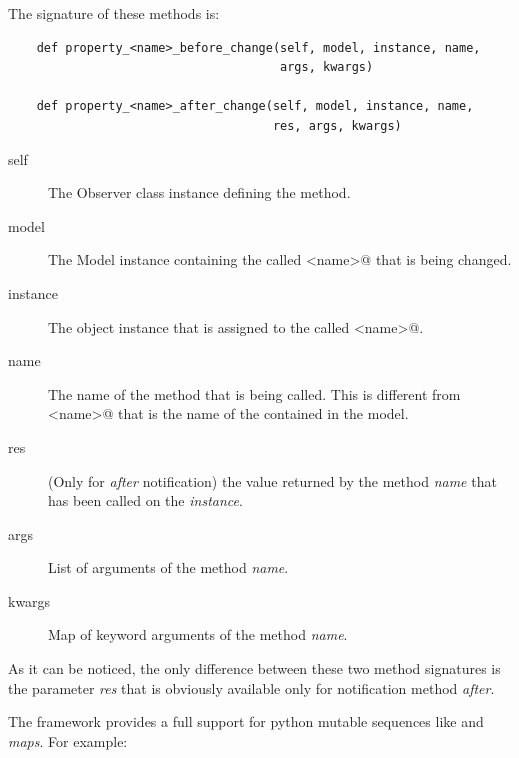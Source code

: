 The signature of these methods is:
{ \codesize 
\begin{verbatim} 
    def property_<name>_before_change(self, model, instance, name,
                                      args, kwargs)

    def property_<name>_after_change(self, model, instance, name, 
                                     res, args, kwargs)
\end{verbatim}
}

\begin{description}
\item[self] The Observer class instance defining the method.
\item[model] The Model instance containing the \OP called
  \verb@<name>@ that is being changed.
\item[instance] The object instance that is assigned to the \OP called
  \verb@<name>@.
\item[name] The name of the method that is being called. This
  is different from \verb@<name>@ that is the name of the \OP
  contained in the model. 
\item[res] (Only for \emph{after} notification) the value returned by
  the method \emph{name} that has been called on the \OP
  \emph{instance}.
\item[args] List of arguments of the method \emph{name}.
\item[kwargs] Map of keyword arguments of the method \emph{name}.
\end{description}

As it can be noticed, the only difference between these two method
signatures is the parameter \emph{res} that is obviously available only
for notification method \emph{after}.

The framework \mvco provides a full support for python mutable
sequences like  and \emph{maps}. For example:


